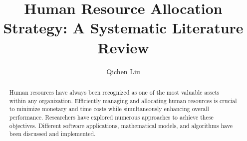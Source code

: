 \documentclass[runningheads]{llncs}
\begin{document}
%
\title{Human Resource Allocation Strategy: A Systematic Literature Review}
%
%
\author{Qichen Liu}

%
%
\maketitle              %
%

\begin{abstract}
Human resources have always been recognized as one of the most valuable assets within any organization. Efficiently managing and allocating human resources is crucial to minimize monetary and time costs while simultaneously enhancing overall performance. Researchers have explored numerous approaches to achieve these objectives. Different software applications, mathematical models, and algorithms have been discussed and implemented. 
\end{abstract}
%
%
%
\end{document}
